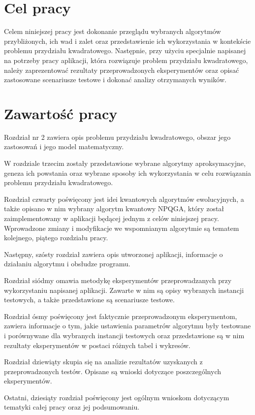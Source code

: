 \section{Cel pracy}
\label{sec:cel}
Celem niniejszej pracy jest dokonanie przeglądu wybranych algorytmów przybliżonych, ich wad i zalet oraz przedstawienie ich wykorzystania w kontekście problemu przydziału kwadratowego. Następnie, przy użyciu specjalnie napisanej na potrzeby pracy aplikacji, która rozwiązuje problem przydziału kwadratowego, należy zaprezentować rezultaty przeprowadzonych eksperymentów oraz opisać zastosowane scenariusze testowe i dokonać analizy otrzymanych wyników.

\section{Zawartość pracy}
\label{sec:zawartosc}
Rozdział nr 2 zawiera opis problemu przydziału kwadratowego, obszar jego zastosowań i jego model matematyczny.

W rozdziale trzecim zostały przedstawione wybrane algorytmy aproksymacyjne, geneza ich powstania oraz wybrane sposoby ich wykorzystania w celu rozwiązania problemu przydziału kwadratowego.

Rozdział czwarty poświęcony jest idei kwantowych algorytmów ewolucyjnych, a także opisano w nim wybrany algorytm kwantowy NPQGA, który został zaimplementowany w aplikacji będącej jednym z celów niniejszej pracy. Wprowadzone zmiany i modyfikacje we wspomnianym algorytmie są tematem kolejnego, piątego rozdziału pracy.

Następny, szósty rozdział zawiera opis utworzonej aplikacji, informacje o działaniu algorytmu i obsłudze programu.

Rozdział siódmy omawia metodykę eksperymentów przeprowadzanych przy wykorzystaniu napisanej aplikacji. Zawarte w nim są opisy wybranych instancji testowych, a także przedstawione są scenariusze testowe.

Rozdział ósmy  poświęcony jest faktycznie przeprowadzonym eksperymentom, zawiera informacje o tym, jakie ustawienia parametrów algorytmu były testowane i porównywane dla wybranych instancji testowych oraz przedstawione są w nim rezultaty eksperymentów w postaci różnych tabel i wykresów.

Rozdział dziewiąty skupia się na analizie rezultatów uzyskanych z przeprowadzonych testów. Opisane są wnioski dotyczące poszczególnych eksperymentów.

Ostatni, dziesiąty rozdział poświęcony jest ogólnym wnioskom dotyczącym tematyki całej pracy oraz jej podsumowaniu.